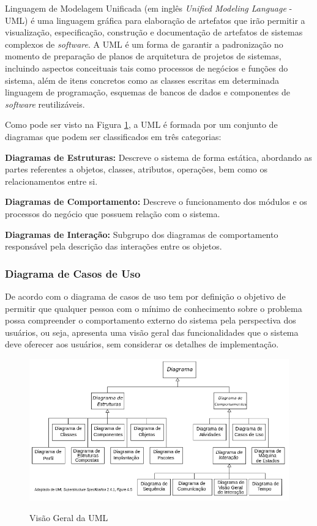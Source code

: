 Linguagem de Modelagem Unificada (em inglês \textit{Unified Modeling Language} - UML) é uma linguagem gráfica para elaboração de artefatos que irão permitir a visualização, especificação, construção e documentação de artefatos de sistemas complexos de \textit{software}. A UML é um forma de garantir a padronização no momento de preparação de planos de arquitetura de projetos de sistemas, incluindo aspectos conceituais tais como processos de negócios e funções do sistema, além de itens concretos como as classes escritas em determinada linguagem de programação, esquemas de bancos de dados e componentes de \textit{software} reutilizáveis.\cite{uml}

Como pode ser visto na Figura \ref{fig:uml}, a UML é formada por um conjunto de diagramas que podem ser classificados em três categorias:

\begin{lista}
\item \textbf{Diagramas de Estruturas:} Descreve o sistema de forma estática, abordando as partes referentes a objetos, classes, atributos, operações, bem como os relacionamentos entre si.
\item \textbf{Diagramas de Comportamento:} Descreve o funcionamento dos módulos e os processos do negócio que possuem relação com o sistema.
\item \textbf{Diagramas de Interação:} Subgrupo dos diagramas de comportamento responsável pela descrição das interações entre os objetos.
\end{lista}

\subsubsection{Diagrama de Casos de Uso}

De acordo com  o diagrama de casos de uso tem por definição o objetivo de permitir que qualquer pessoa com o mínimo de conhecimento sobre o problema possa compreender o comportamento externo do sistema pela perspectiva dos usuários, ou seja, apresenta uma visão geral das funcionalidades que o sistema deve oferecer aos usuários, sem considerar os detalhes de implementação.

\begin{figure}[H]
\caption{Visão Geral da UML}
\centering
\includegraphics[width=1\textwidth]{imagens/uml.png}
\label{fig:uml}
\end{figure}

